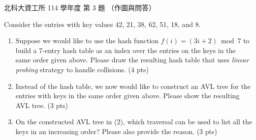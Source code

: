 \begin{pastexam}[label={px:ntut-114-ci-03}]{北科大資工所 114 學年度 第 3 題}
（作圖與問答）

Consider the entries with key values 42, 21, 38, 62, 51, 18, and 8.
\begin{enumerate}[label=(\arabic*)]
\item Suppose we would like to use the hash function \underline{$f(i)=(3i+2)\bmod 7$} to build a 7-entry hash table as an index over the entries on the keys in the same order given above. Please draw the resulting hash table that uses \textit{linear probing} strategy to handle collisions. (4 pts)
\item Instead of the hash table, we now would like to construct an AVL tree for the entries with keys in the same order given above. Please show the resulting AVL tree. (3 pts)
\item On the constructed AVL tree in (2), which traversal can be used to list all the keys in an increasing order? Please also provide the reason. (3 pts)
\end{enumerate}
\end{pastexam}

